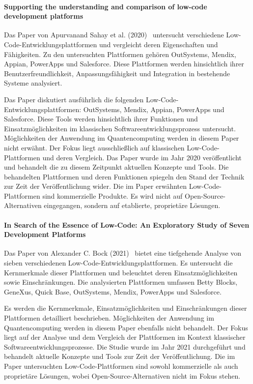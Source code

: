 \paragraph{Supporting the understanding and comparison of low-code development platforms}

Das Paper von Apurvanand Sahay et al. (2020)~\cite{Sahay_2020} untersucht verschiedene Low-Code-Entwicklungsplattformen und vergleicht deren 
Eigenschaften und Fähigkeiten. Zu den untersuchten Plattformen gehören OutSystems, Mendix, Appian, PowerApps und Salesforce. 
Diese Plattformen werden hinsichtlich ihrer Benutzerfreundlichkeit, Anpassungsfähigkeit und Integration in bestehende Systeme analysiert.

Das Paper diskutiert ausführlich die folgenden Low-Code-Entwicklungsplattformen: OutSystems, Mendix, Appian, PowerApps und Salesforce. 
Diese Tools werden hinsichtlich ihrer Funktionen und Einsatzmöglichkeiten im klassischen Softwareentwicklungsprozess untersucht.
Möglichkeiten der Anwendung im Quantencomputing werden in diesem Paper nicht erwähnt. Der Fokus liegt ausschließlich auf klassischen 
Low-Code-Plattformen und deren Vergleich.
Das Paper wurde im Jahr 2020 veröffentlicht und behandelt die zu diesem Zeitpunkt aktuellen Konzepte und Tools. Die behandelten 
Plattformen und deren Funktionen spiegeln den Stand der Technik zur Zeit der Veröffentlichung wider.
Die im Paper erwähnten Low-Code-Plattformen sind kommerzielle Produkte. Es wird nicht auf Open-Source-Alternativen 
eingegangen, sondern auf etablierte, proprietäre Lösungen.

\paragraph{In Search of the Essence of Low-Code: An Exploratory Study of Seven Development Platforms}

Das Paper von Alexander C. Bock (2021)~\cite{Bock_2021_essence} bietet eine tiefgehende Analyse von sieben verschiedenen Low-Code-Entwicklungsplattformen. 
Es untersucht die Kernmerkmale dieser Plattformen und beleuchtet deren Einsatzmöglichkeiten sowie Einschränkungen. Die analysierten 
Plattformen umfassen Betty Blocks, GeneXus, Quick Base, OutSystems, Mendix, PowerApps und Salesforce.

Es werden die Kernmerkmale, Einsatzmöglichkeiten und Einschränkungen dieser Plattformen detailliert beschrieben. 
Möglichkeiten der Anwendung im Quantencomputing werden in diesem Paper ebenfalls nicht behandelt. 
Der Fokus liegt auf der Analyse und dem Vergleich der Plattformen im Kontext klassischer Softwareentwicklungsprozesse. 
Die Studie wurde im Jahr 2021 durchgeführt und behandelt aktuelle Konzepte und Tools zur Zeit der Veröffentlichung. 
Die im Paper untersuchten Low-Code-Plattformen sind sowohl kommerzielle als auch proprietäre Lösungen, 
wobei Open-Source-Alternativen nicht im Fokus stehen.

